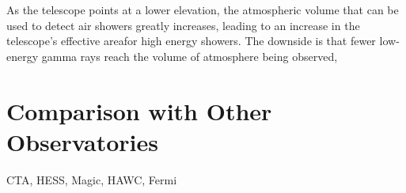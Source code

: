 As the telescope points at a lower elevation, the atmospheric volume that can be used to detect air showers greatly increases, leading to an increase in the telescope's effective areafor high energy showers.
The downside is that fewer low-energy gamma rays reach the volume of atmosphere being observed, 


\section{Comparison with Other Observatories}


CTA, HESS, Magic, HAWC, Fermi





